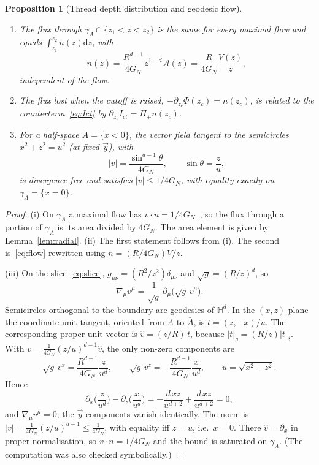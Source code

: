 \documentclass[11pt]{article}
\newtheorem{proposition}{Proposition}[section]
\theoremstyle{definition}\newtheorem{definition}{Definition}[section]
\theoremstyle{remark}\newtheorem*{remark}{Remark}
\newcommand{\cA}{\mathcal{A}}
\newcommand{\dd}{\mathrm{d}}
\newcommand{\GN}{G_N}
\begin{document}
\begin{proposition}[Thread depth distribution and geodesic flow]
\label{prop:threads}
\begin{enumerate}
\item[(i)] The flux through $\gamma_A\cap\{z_1<z<z_2\}$ is the same for every maximal flow and equals
$\int_{z_1}^{z_2}n(z)\dd z$, with
\begin{equation}
n(z)=\frac{R^{d-1}}{4\GN}z^{1-d}\cA(z)=\frac{R}{4\GN}\frac{V(z)}{z},
\end{equation}
independent of the flow.
\item[(ii)] The flux lost when the cutoff is raised, $-\partial_{z_c}\Phi(z_c)=n(z_c)$, is related to the
counterterm~\eqref{eq:Ict} by $\partial_{z_c}I_{ct}=\Pi_+n(z_c)$.
\item[(iii)] For a half-space $A=\{x<0\}$, the vector field tangent to the semicircles $x^2+z^2=u^2$ (at fixed
$\vec y$), with
\begin{equation}
|v|=\frac{\sin^{d-1}\theta}{4\GN},\qquad \sin\theta=\frac zu,
\label{eq:geoflow}
\end{equation}
is divergence-free and satisfies $|v|\le1/4\GN$, with equality exactly on $\gamma_A=\{x=0\}$.
\end{enumerate}
\end{proposition}
\begin{proof}
(i) On $\gamma_A$ a maximal flow has $v\cdot n=1/4\GN$~\cite{FH}, so the flux through a portion of $\gamma_A$
is its area divided by $4\GN$. The area element is given by Lemma~\ref{lem:radial}.
(ii) The first statement follows from (i). The second is~\eqref{eq:flow} rewritten using
$n=(R/4\GN)V/z$.

(iii) On the slice~\eqref{eq:slice}, $g_{\mu\nu}=(R^2/z^2)\delta_{\mu\nu}$ and $\sqrt g=(R/z)^d$, so
\begin{equation}
\nabla_\mu v^\mu=\frac{1}{\sqrt g}\,\partial_\mu\big(\sqrt g\,v^\mu\big).
\end{equation}
Semicircles orthogonal to the boundary are geodesics of $\mathbb H^d$. In the $(x,z)$ plane the coordinate
unit tangent, oriented from $A$ to $\bar A$, is $t=(z,-x)/u$. The corresponding proper unit vector is
$\hat v=(z/R)\,t$, because $|t|_g=(R/z)|t|_\delta$. With $v=\frac1{4\GN}(z/u)^{d-1}\hat v$, the only
non-zero components are
\begin{equation}
\sqrt g\,v^x=\frac{R^{d-1}}{4\GN}\frac{z}{u^d},\qquad \sqrt g\,v^z=-\frac{R^{d-1}}{4\GN}\frac{x}{u^d},
\qquad u=\sqrt{x^2+z^2}.
\end{equation}
Hence
\begin{equation}
\partial_x\Big(\frac{z}{u^d}\Big)-\partial_z\Big(\frac{x}{u^d}\Big)
=-\frac{d\,xz}{u^{d+2}}+\frac{d\,xz}{u^{d+2}}=0,
\end{equation}
and $\nabla_\mu v^\mu=0$; the $\vec y$-components vanish identically. The norm is
$|v|=\frac1{4\GN}(z/u)^{d-1}\le\frac1{4\GN}$, with equality iff $z=u$, i.e.\ $x=0$. There $\hat v=\partial_x$
in proper normalisation, so $v\cdot n=1/4\GN$ and the bound is saturated on $\gamma_A$. (The computation was
also checked symbolically.)
\end{proof}
\end{document}
